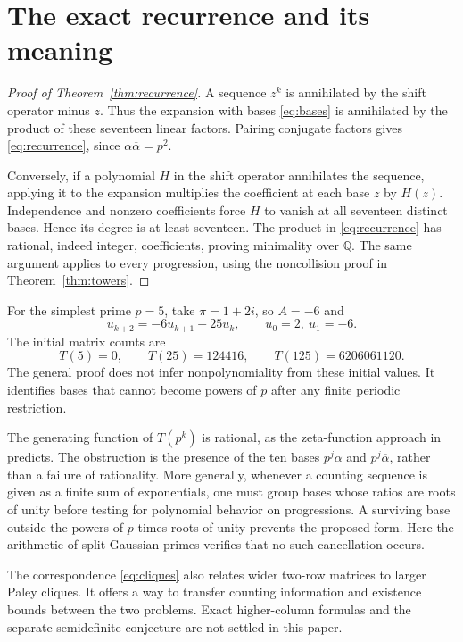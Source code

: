 \documentclass[11pt]{article}
\newcommand{\Q}{\mathbb Q}
\begin{document}
\section{The exact recurrence and its meaning}
\begin{proof}[Proof of Theorem~\ref{thm:recurrence}]
A sequence $z^k$ is annihilated by the shift operator minus $z$. Thus the expansion with bases \eqref{eq:bases} is annihilated by the product of these seventeen linear factors. Pairing conjugate factors gives \eqref{eq:recurrence}, since $\alpha\overline\alpha=p^2$.

Conversely, if a polynomial $H$ in the shift operator annihilates the sequence, applying it to the expansion multiplies the coefficient at each base $z$ by $H(z)$. Independence and nonzero coefficients force $H$ to vanish at all seventeen distinct bases. Hence its degree is at least seventeen. The product in \eqref{eq:recurrence} has rational, indeed integer, coefficients, proving minimality over $\Q$. The same argument applies to every progression, using the noncollision proof in Theorem~\ref{thm:towers}.
\end{proof}

For the simplest prime $p=5$, take $\pi=1+2i$, so $A=-6$ and
\[
 u_{k+2}=-6u_{k+1}-25u_k,\qquad u_0=2,\ u_1=-6.
\]
The initial matrix counts are
\[
 T(5)=0,\qquad T(25)=124416,\qquad T(125)=6206061120.
\]
The general proof does not infer nonpolynomiality from these initial values. It identifies bases that cannot become powers of $p$ after any finite periodic restriction.

The generating function of $T(p^k)$ is rational, as the zeta-function approach in \cite{AP} predicts. The obstruction is the presence of the ten bases $p^j\alpha$ and $p^j\overline\alpha$, rather than a failure of rationality. More generally, whenever a counting sequence is given as a finite sum of exponentials, one must group bases whose ratios are roots of unity before testing for polynomial behavior on progressions. A surviving base outside the powers of $p$ times roots of unity prevents the proposed form. Here the arithmetic of split Gaussian primes verifies that no such cancellation occurs.

The correspondence \eqref{eq:cliques} also relates wider two-row matrices to larger Paley cliques. It offers a way to transfer counting information and existence bounds between the two problems. Exact higher-column formulas and the separate semidefinite conjecture are not settled in this paper.
\end{document}
